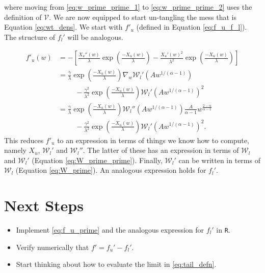 \documentclass{article}
\newcommand{\sW}{\mathscr{W}}
\newcommand{\sV}{\mathscr{V}}
\begin{document}
where moving from \ref{eq:w_prime_prime_1} to \ref{eq:w_prime_prime_2} uses the definition of $\sV$. We are now equipped to start un-tangling the mess that is Equation \eqref{eq:wt_dens}. We start with $f'_u$ (defined in Equation \eqref{eq:f_u_f_l}). The structure of $f_l'$ will be analogous. 

\begin{align}
    f'_u(w) &= - \left[ \frac{X_u''(w)}{\lambda} \exp \left( \frac{-X_u(w)}{\lambda} \right) - \frac{X_u'(w)^2}{\lambda^2} \exp \left( \frac{-X_u(w)}{\lambda} \right)\right]\\
    &= \frac{\gamma}{\lambda} \exp \left( \frac{-X_u(w)}{\lambda} \right) \nabla_w \sW_l'(Aw^{1/(\alpha - 1)}) \\
    &\hspace{1cm}- \frac{\gamma^2}{\lambda^2} \exp \left( \frac{-X_u(w)}{\lambda} \right) \sW_l'\left(A w^{1/(\alpha - 1)}\right)^2\\
    &= \frac{\gamma}{\lambda} \exp \left( \frac{-X_u(w)}{\lambda} \right) \sW_l''(A w^{1/(\alpha - 1)}) \frac{A}{\alpha - 1}w^{\frac{2 - \alpha}{\alpha - 1}}\\
    & \hspace{1cm} - \frac{\gamma^2}{\lambda^2} \exp \left( \frac{-X_u(w)}{\lambda} \right) \sW_l'\left(A w^{1/(\alpha - 1)}\right)^2. \label{eq:f_u_prime}
\end{align}
%
This reduces $f'_u$ to an expression in terms of things we know how to compute, namely $X_u$, $\sW_l'$ and $\sW_l''$. The latter of these has an expression in terms of $\sW_l$ and $\sW_l'$ (Equation \eqref{eq:W_prime_prime}). Finally, $\sW_l'$ can be written in terms of $\sW_l$ (Equation \eqref{eq:W_prime}). An analogous expression holds for $f_l'$.

\section*{Next Steps}
\begin{itemize}
    \item Implement \ref{eq:f_u_prime} and the analogous expression for $f_l'$ in \texttt{R}.
    \item Verify numerically that $f' = f_u' - f_l'$.
    \item Start thinking about how to evaluate the limit in \eqref{eq:tail_defn}.
\end{itemize}
        



\end{document}
